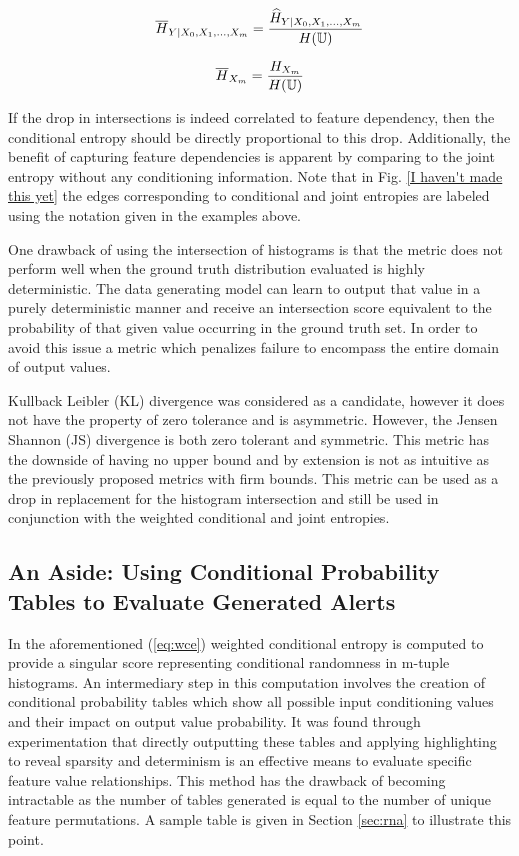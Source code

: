 \begin{equation}
\label{eq:norm_wce}
\overline{H}_{Y|X_0, X_1, ..., X_m} = {{\widehat{H}_{Y|X_0, X_1, ..., X_m}} \over{ H(\mathbb{U})}}
\end{equation}


\begin{equation}
\label{eq:norm_je}
\overline{H}_{X_m} = {{{H}_{X_m}} \over{ H(\mathbb{U})}}
\end{equation}

If the drop in intersections is indeed correlated to feature dependency, then the conditional entropy should be directly proportional to this drop. Additionally, the benefit of capturing feature dependencies is apparent by comparing to the joint entropy without any conditioning information. Note that in Fig. \ref{I haven't made this yet} the edges corresponding to conditional and joint entropies are labeled using the notation given in the examples above.

One drawback of using the intersection of histograms is that the metric does not perform well when the ground truth distribution evaluated is highly deterministic. The data generating model can learn to output that value in a purely deterministic manner and receive an intersection score equivalent to the probability of that given value occurring in the ground truth set. In order to avoid this issue a metric which penalizes failure to encompass the entire domain of output values. 

Kullback Leibler (KL) divergence was considered as a candidate, however it does not have the property of zero tolerance and is asymmetric. However, the Jensen Shannon (JS) divergence is both zero tolerant and symmetric. This metric has the downside of having no upper bound and by extension is not as intuitive as the previously proposed metrics with firm bounds. This metric can be used as a drop in replacement for the histogram intersection and still be used in conjunction with the weighted conditional and joint entropies.

\subsection{An Aside: Using Conditional Probability Tables to Evaluate Generated Alerts}

In the aforementioned (\ref{eq:wce}) weighted conditional entropy is computed to provide a singular score representing conditional randomness in m-tuple histograms. An intermediary step in this computation involves the creation of conditional probability tables which show all possible input conditioning values and their impact on output value probability. It was found through experimentation that directly outputting these tables and applying highlighting to reveal sparsity and determinism is an effective means to evaluate specific feature value relationships. This method has the drawback of becoming intractable as the number of tables generated is equal to the number of unique feature permutations. A sample table is given in Section \ref{sec:rna} to illustrate this point. 
